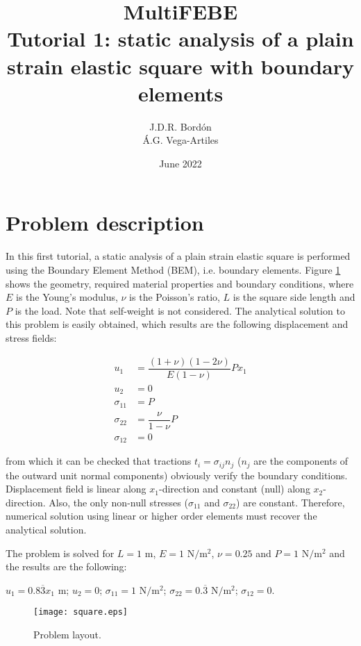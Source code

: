 \documentclass[A4]{article}
\title{MultiFEBE \\ Tutorial 1: static analysis of a plain strain elastic square with boundary elements}
\author{J.D.R. Bord\'on\\ \'A.G. Vega-Artiles}
\date{June 2022}
\begin{document}
\maketitle

\tableofcontents 

\section{Problem description}

In this first tutorial, a static analysis of a plain strain elastic square is performed using the Boundary Element Method (BEM), i.e. boundary elements. Figure \ref{fig:layout} shows the geometry, required material properties and boundary conditions, where $E$ is the Young's modulus, $\nu$ is the Poisson's ratio, $L$ is the square side length and $P$ is the load. Note that self-weight is not considered. The analytical solution to this problem is easily obtained, which results are the following displacement and stress fields:

\begin{align}
u_1 &= \dfrac{(1+\nu)(1-2\nu)}{E(1-\nu)} P x_1 \\
u_2 &= 0 \\
\sigma_{11} &= P \\
\sigma_{22} &= \dfrac{\nu}{1-\nu}P \\
\sigma_{12} &= 0
\end{align}

from which it can be checked that tractions $t_i=\sigma_{ij}n_j$ ($n_j$ are the components of the outward unit normal components) obviously verify the boundary conditions. Displacement field is linear along $x_1$-direction and constant (null) along $x_2$-direction. Also, the only non-null stresses ($\sigma_{11}$ and $\sigma_{22}$) are constant. Therefore, numerical solution using linear or higher order elements must recover the analytical solution.

The problem is solved for $L=1$ $\mathrm{m}$, $E=1$ $\mathrm{N/m^2}$, $\nu=0.25$  and $P=1$ $\mathrm{N/m^2}$ and the results are the following:

	$u_1 = 0.8\overline{3} x_1$ $\mathrm{m}$;
	$u_2 = 0$;
	$\sigma_{11} = 1$ $\mathrm{N/m^2}$;
	$\sigma_{22} = 0.\overline{3}$ $\mathrm{N/m^2}$;
	$\sigma_{12} = 0$.

\begin{figure}[h]
	\centering
	\texttt{[image: square.eps]}
	\caption{Problem layout.}
	\label{fig:layout}
\end{figure}
\end{document}
